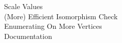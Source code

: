 \documentclass[preview]{standalone}
\begin{document}
Scale Values\\(More) Efficient Isomorphism Check\\Enumerating On More Vertices\\Documentation\\
\end{document}
